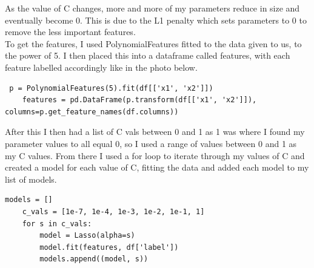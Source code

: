 \documentclass[11pt]{article} %
\begin{document}
As the value of C changes, more and more of my parameters reduce in size and eventually become 0. This is due to the L1 penalty which sets parameters to 0 to remove the less important features.
\\To get the features, I used PolynomialFeatures fitted to the data given to us, to the power of 5. I then placed this into a dataframe called features, with each feature labelled accordingly like in the photo below.
\begin{verbatim}
 p = PolynomialFeatures(5).fit(df[['x1', 'x2']])
    features = pd.DataFrame(p.transform(df[['x1', 'x2']]), columns=p.get_feature_names(df.columns))
\end{verbatim}
After this I then had a list of C vals between 0 and 1 as 1 was where I found my parameter values to all equal 0, so I used a range of values between 0 and 1 as my C values. From there I used a for loop to iterate through my values of C and created a model for each value of C, fitting the data and added each model to my list of models. 
\begin{verbatim}
models = []
    c_vals = [1e-7, 1e-4, 1e-3, 1e-2, 1e-1, 1]
    for s in c_vals:
        model = Lasso(alpha=s)
        model.fit(features, df['label'])
        models.append((model, s))
\end{verbatim}
\end{document}

